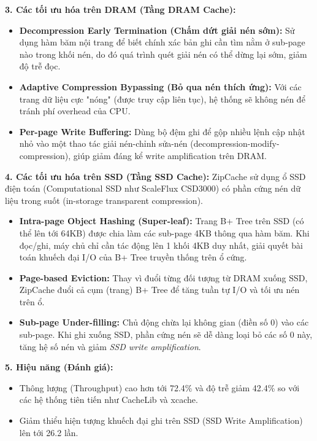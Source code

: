 \documentclass[12pt,a4paper]{article}
\begin{document}
\textbf{3. Các tối ưu hóa trên DRAM (Tầng DRAM Cache):}
\begin{itemize}
    \item \textbf{Decompression Early Termination (Chấm dứt giải nén sớm):} Sử dụng hàm băm nội trang để biết chính xác bản ghi cần tìm nằm ở sub-page nào trong khối nén, do đó quá trình quét giải nén có thể dừng lại sớm, giảm độ trễ đọc.
    \item \textbf{Adaptive Compression Bypassing (Bỏ qua nén thích ứng):} Với các trang dữ liệu cực "nóng" (được truy cập liên tục), hệ thống sẽ không nén để tránh phí overhead của CPU.
    \item \textbf{Per-page Write Buffering:} Dùng bộ đệm ghi để gộp nhiều lệnh cập nhật nhỏ vào một thao tác giải nén-chỉnh sửa-nén (decompression-modify-compression), giúp giảm đáng kể write amplification trên DRAM.
\end{itemize}

\textbf{4. Các tối ưu hóa trên SSD (Tầng SSD Cache):}
ZipCache sử dụng ổ SSD điện toán (Computational SSD như ScaleFlux CSD3000) có phần cứng nén dữ liệu trong suốt (in-storage transparent compression).
\begin{itemize}
    \item \textbf{Intra-page Object Hashing (Super-leaf):} Trang B+ Tree trên SSD (có thể lên tới 64KB) được chia làm các sub-page 4KB thông qua hàm băm. Khi đọc/ghi, máy chủ chỉ cần tác động lên 1 khối 4KB duy nhất, giải quyết bài toán khuếch đại I/O của B+ Tree truyền thống trên ổ cứng.
    \item \textbf{Page-based Eviction:} Thay vì đuổi từng đối tượng từ DRAM xuống SSD, ZipCache đuổi cả cụm (trang) B+ Tree để tăng tuần tự I/O và tối ưu nén trên ổ.
    \item \textbf{Sub-page Under-filling:} Chủ động chừa lại không gian (điền số 0) vào các sub-page. Khi ghi xuống SSD, phần cứng nén sẽ dễ dàng loại bỏ các số 0 này, tăng hệ số nén và giảm \textit{SSD write amplification}.
\end{itemize}

\textbf{5. Hiệu năng (Đánh giá):}
\begin{itemize}
    \item Thông lượng (Throughput) cao hơn tới 72.4\% và độ trễ giảm 42.4\% so với các hệ thống tiên tiến như CacheLib và xcache.
    \item Giảm thiểu hiện tượng khuếch đại ghi trên SSD (SSD Write Amplification) lên tới 26.2 lần.
\end{itemize}
\end{document}
